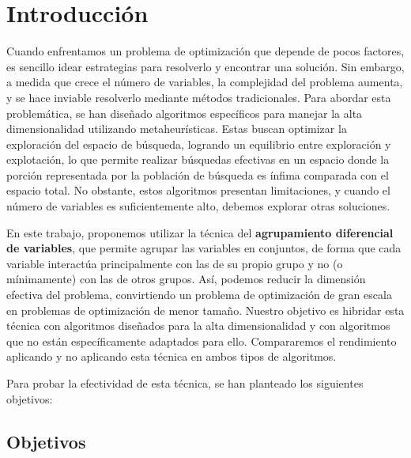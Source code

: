 %


\chapter{Introducción}

\indent Cuando enfrentamos un problema de optimización que depende de pocos factores, es sencillo idear estrategias para resolverlo y encontrar una solución. Sin embargo, a medida que crece el número de variables, la complejidad del problema aumenta, y se hace inviable resolverlo mediante métodos tradicionales. Para abordar esta problemática, se han diseñado algoritmos específicos para manejar la alta dimensionalidad utilizando metaheurísticas. Estas buscan optimizar la exploración del espacio de búsqueda, logrando un equilibrio entre exploración y explotación, lo que permite realizar búsquedas efectivas en un espacio donde la porción representada por la población de búsqueda es ínfima comparada con el espacio total. No obstante, estos algoritmos presentan limitaciones, y cuando el número de variables es suficientemente alto, debemos explorar otras soluciones.

En este trabajo, proponemos utilizar la técnica del \textbf{agrupamiento diferencial de variables}, que permite agrupar las variables en conjuntos, de forma que cada variable interactúa principalmente con las de su propio grupo y no (o mínimamente) con las de otros grupos. Así, podemos reducir la dimensión efectiva del problema, convirtiendo un problema de optimización de gran escala en problemas de optimización de menor tamaño. Nuestro objetivo es hibridar esta técnica con algoritmos diseñados para la alta dimensionalidad y con algoritmos que no están específicamente adaptados para ello. Compararemos el rendimiento aplicando y no aplicando esta técnica en ambos tipos de algoritmos.

Para probar la efectividad de esta técnica, se han planteado los siguientes objetivos:

\section*{Objetivos}

